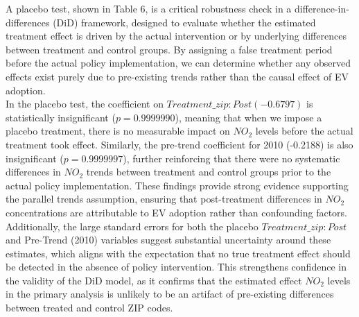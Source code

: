 \documentclass[12pt]{article}
\newcommand\tab[1][.50cm]{\hspace*{#1}}
\begin{document}
	\begin{multicols}{2}
		
		A placebo test, shown in Table 6, is a critical robustness check in a difference-in-differences (DiD) framework, designed to evaluate whether the estimated treatment effect is driven by the actual intervention or by underlying differences between treatment and control groups. By assigning a false treatment period before the actual policy implementation, we can determine whether any observed effects exist purely due to pre-existing trends rather than the causal effect of EV adoption.\\
		\tab In the placebo test, the coefficient on $Treatment\_zip:Post (-0.6797)$ is statistically insignificant ($p=0.9999990$), meaning that when we impose a placebo treatment, there is no measurable impact on $NO_2$ levels before the actual treatment took effect. Similarly, the pre-trend coefficient for 2010 (-0.2188) is also insignificant ($p=0.9999997$), further reinforcing that there were no systematic differences in $NO_2$ trends between treatment and control groups prior to the actual policy implementation. These findings provide strong evidence supporting the parallel trends assumption, ensuring that post-treatment differences in $NO_2$  concentrations are attributable to EV adoption rather than confounding factors.\\
		\tab Additionally, the large standard errors for both the placebo $Treatment\_zip:Post$ and Pre-Trend (2010) variables suggest substantial uncertainty around these estimates, which aligns with the expectation that no true treatment effect should be detected in the absence of policy intervention. This strengthens confidence in the validity of the DiD model, as it confirms that the estimated effect $NO_2$ levels in the primary analysis is unlikely to be an artifact of pre-existing differences between treated and control ZIP codes.
		
	\end{multicols}
	
\end{document}
